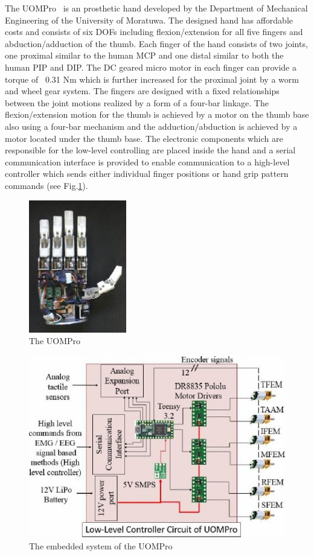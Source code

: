 \documentclass[a4paper, 10pt, conference]{ieeeconf}      %
\begin{document}
The UOMPro~\cite{uompro} is an prosthetic hand developed by the Department of Mechanical Engineering of the University of Moratuwa. The designed hand has affordable costs and consists of six DOFs including flexion/extension for all five fingers and abduction/adduction of the thumb. Each finger of the hand consists of two joints, one proximal similar to the human MCP and one distal similar to both the human PIP and DIP. The DC geared micro motor in each finger can provide a torque of ~0.31 Nm which is further increased for the proximal joint by a worm and wheel gear system. The fingers are designed with a fixed relationships between the joint motions realized by a form of a four-bar linkage. The flexion/extension motion for the thumb is achieved by a motor on the thumb base also using a four-bar mechanism and the adduction/abduction is achieved by a motor located under the thumb base. The electronic components which are responsible for the low-level controlling are placed inside the hand and a serial communication interface is provided to enable communication to a high-level controller which sends either individual finger positions or hand grip pattern commands (see Fig.\ref{fig:embuompro}).

\begin{figure}[h]

	\centering
	\includegraphics[scale=1.0]{images/UOMPro}
	
	\caption{The UOMPro}
\end{figure}

\begin{figure}[h]

	\centering
	\includegraphics[scale=0.7]{images/UOMPro2}
	
	\caption{The embedded system of the UOMPro}
	\label{fig:embuompro}
\end{figure}
\end{document}
